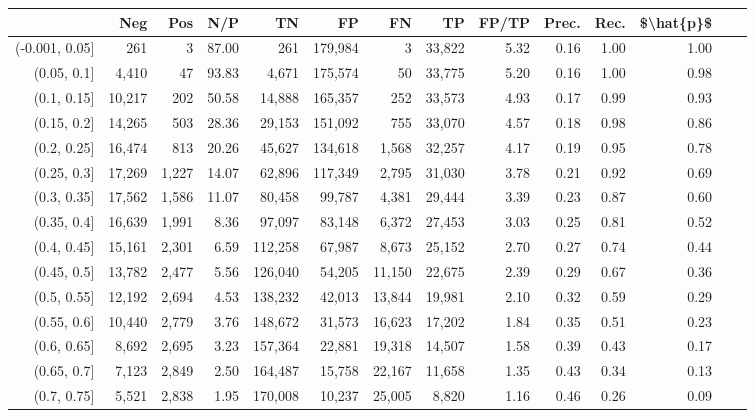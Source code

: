 \begin{tabular}{rrrrrrrrrrrrrr}
\toprule
{} &     Neg &    Pos &    N/P &       TN &       FP &      FN &      TP & FP/TP & Prec. &  Rec. & \$\textbackslash hat\{p\}\$ \\
\midrule
(-0.001, 0.05] &     261 &      3 &  87.00 &      261 &  179,984 &       3 &  33,822 &  5.32 &  0.16 &  1.00 &      1.00 \\
(0.05, 0.1]    &   4,410 &     47 &  93.83 &    4,671 &  175,574 &      50 &  33,775 &  5.20 &  0.16 &  1.00 &      0.98 \\
(0.1, 0.15]    &  10,217 &    202 &  50.58 &   14,888 &  165,357 &     252 &  33,573 &  4.93 &  0.17 &  0.99 &      0.93 \\
(0.15, 0.2]    &  14,265 &    503 &  28.36 &   29,153 &  151,092 &     755 &  33,070 &  4.57 &  0.18 &  0.98 &      0.86 \\
(0.2, 0.25]    &  16,474 &    813 &  20.26 &   45,627 &  134,618 &   1,568 &  32,257 &  4.17 &  0.19 &  0.95 &      0.78 \\
(0.25, 0.3]    &  17,269 &  1,227 &  14.07 &   62,896 &  117,349 &   2,795 &  31,030 &  3.78 &  0.21 &  0.92 &      0.69 \\
(0.3, 0.35]    &  17,562 &  1,586 &  11.07 &   80,458 &   99,787 &   4,381 &  29,444 &  3.39 &  0.23 &  0.87 &      0.60 \\
(0.35, 0.4]    &  16,639 &  1,991 &   8.36 &   97,097 &   83,148 &   6,372 &  27,453 &  3.03 &  0.25 &  0.81 &      0.52 \\
(0.4, 0.45]    &  15,161 &  2,301 &   6.59 &  112,258 &   67,987 &   8,673 &  25,152 &  2.70 &  0.27 &  0.74 &      0.44 \\
(0.45, 0.5]    &  13,782 &  2,477 &   5.56 &  126,040 &   54,205 &  11,150 &  22,675 &  2.39 &  0.29 &  0.67 &      0.36 \\
(0.5, 0.55]    &  12,192 &  2,694 &   4.53 &  138,232 &   42,013 &  13,844 &  19,981 &  2.10 &  0.32 &  0.59 &      0.29 \\
(0.55, 0.6]    &  10,440 &  2,779 &   3.76 &  148,672 &   31,573 &  16,623 &  17,202 &  1.84 &  0.35 &  0.51 &      0.23 \\
(0.6, 0.65]    &   8,692 &  2,695 &   3.23 &  157,364 &   22,881 &  19,318 &  14,507 &  1.58 &  0.39 &  0.43 &      0.17 \\
(0.65, 0.7]    &   7,123 &  2,849 &   2.50 &  164,487 &   15,758 &  22,167 &  11,658 &  1.35 &  0.43 &  0.34 &      0.13 \\
(0.7, 0.75]    &   5,521 &  2,838 &   1.95 &  170,008 &   10,237 &  25,005 &   8,820 &  1.16 &  0.46 &  0.26 &      0.09 \\

\end{tabular}
